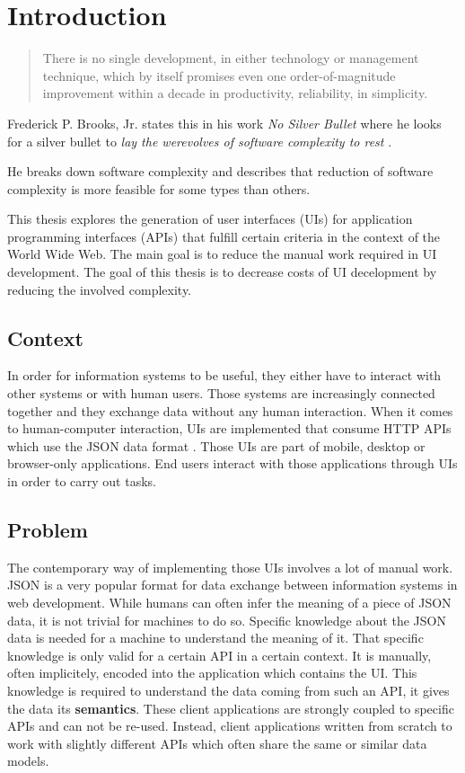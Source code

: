\section{Introduction}\label{introduction}

\begin{quotation}
There is no single development, in either technology or management technique, which by itself promises even one order-of-magnitude improvement within a decade in productivity, reliability, in simplicity.
\end{quotation}

Frederick P. Brooks, Jr. states this in his work \textit{No Silver Bullet} where he looks for a silver bullet to \textit{lay the werevolves of software complexity to rest} \citep{nosilverbullet}.

He breaks down software complexity and describes that reduction of software complexity is more feasible for some types than others.

This thesis explores the generation of user interfaces (UIs) for application programming interfaces (APIs) that fulfill certain criteria in the context of the World Wide Web. The main goal is to reduce the manual work required in UI development. The goal of this thesis is to decrease costs of UI decelopment by reducing the involved complexity.

\subsection{Context}\label{context}
In order for information systems to be useful, they either have to interact with other systems or with human users. Those systems are increasingly connected together and they exchange data without any human interaction. When it comes to human-computer interaction, UIs are implemented that consume HTTP APIs which use the JSON data format \citep{jsonformat}. Those UIs are part of mobile, desktop or browser-only applications. End users interact with those applications through UIs in order to carry out tasks.

\subsection{Problem}\label{problem}
The contemporary way of implementing those UIs involves a lot of manual work. JSON is a very popular format for data exchange between information systems in web development. While humans can often infer the meaning of a piece of JSON data, it is not trivial for machines to do so. Specific knowledge about the JSON data is needed for a machine to understand the meaning of it. That specific knowledge is only valid for a certain API in a certain context. It is manually, often implicitely, encoded into the application which contains the UI. This knowledge is required to understand the data coming from such an API, it gives the data its \textbf{semantics}. These client applications are strongly coupled to specific APIs and can not be re-used. Instead, client applications written from scratch to work with slightly different APIs which often share the same or similar data models.

